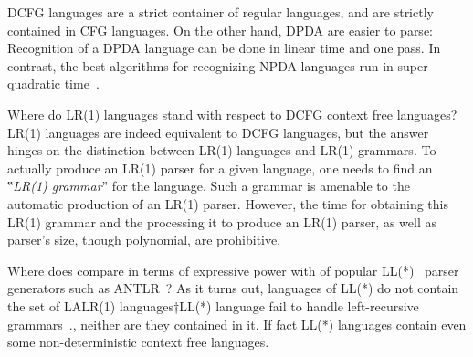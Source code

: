 DCFG languages are a strict container of regular languages,
  and are strictly contained in CFG languages.
On the other hand, DPDA are easier to parse:
  Recognition of a DPDA language
  can be done in linear time and one pass.
  In contrast, the best algorithms for recognizing NPDA languages run in super-quadratic time~\cite{Younger:1967,Cocke:1969,Earley:1970}.

Where do LR(1) languages stand with respect to DCFG context free languages?
LR(1) languages are indeed equivalent to DCFG languages, but
the answer hinges on the distinction
  between LR(1) languages and LR(1) grammars.
To actually produce an LR(1) parser for a given language,
  one needs to find an ‟\emph{LR(1) grammar}” for the language.
Such a grammar is amenable to
  the automatic production of an LR(1) parser.
However, the time for obtaining this LR(1) grammar and the processing it to produce an LR(1) parser,
  as well as parser's size,
  though polynomial, are prohibitive.

Where does \Self compare in terms of expressive power with of popular LL(*)~\cite{Parr:2011} parser generators such
  as ANTLR~\cite{Parr:1995}?
  As it turns out, languages of LL(*) do not contain the set of LALR(1) languages†{LL(*) language fail to handle left-recursive 
    grammars~\cite{Parr:2011}.},
neither are they contained in it. If fact LL(*) languages
  contain even some non-deterministic context free languages.
